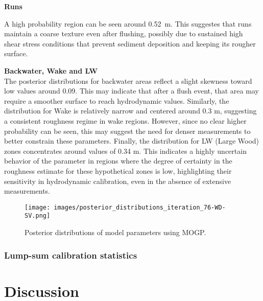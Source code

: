 \documentclass[draft,linenumbers,onecolumn]{agujournal2019} %
\begin{document}
\textbf{Runs}

A high probability region can be seen around 0.52~m. This suggestes that runs maintain a coarse texture even after flushing, possibly due to sustained high shear stress conditions that prevent sediment deposition and keeping its rougher surface. 

\textbf{Backwater, Wake and LW} \\

The posterior distributions for backwater areas reflect a slight skewness toward low values around 0.09. This may indicate that after a flush event, that area may require a smoother surface to reach hydrodynamic values. Similarly, the distribution for Wake is relatively narrow and centered around 0.3 m, suggesting a consistent roughness regime in wake regions. However, since no clear higher probability can be seen, this may suggest the need for denser measurements to better constrain these parameters. Finally, the distribution for LW (Large Wood) zones concentrates around values of 0.34 m. This indicates a highly uncertain behavior of the parameter in regions where the degree of certainty in the roughness estimate for these hypothetical zones is low, highlighting their sensitivity in hydrodynamic calibration, even in the absence of extensive measurements.

\begin{figure}[htbp]
	\centering
	\texttt{[image: images/posterior\_distributions\_iteration\_76-WD-SV.png]}
	\caption{Posterior distributions of model parameters using MOGP.}
	\label{fig:posterior_distributions}
\end{figure}

\subsubsection{Lump-sum calibration statistics}




\section{Discussion}





%
%
%
%
%
%
\end{document}
